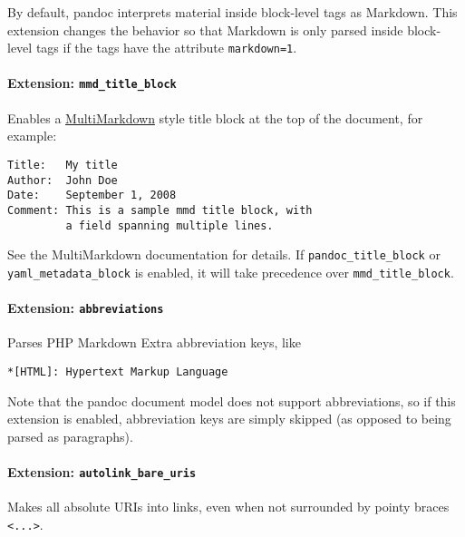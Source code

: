 \documentclass[]{article}
\let\oldparagraph\paragraph
\renewcommand{\paragraph}[1]{\oldparagraph{#1}\mbox{}}
\begin{document}
By default, pandoc interprets material inside block-level tags as
Markdown. This extension changes the behavior so that Markdown is only
parsed inside block-level tags if the tags have the attribute
\texttt{markdown=1}.

\paragraph{\texorpdfstring{Extension:
\texttt{mmd\_title\_block}}{Extension: mmd\_title\_block}}\label{extension-mmd_title_block}

Enables a \href{http://fletcherpenney.net/multimarkdown/}{MultiMarkdown}
style title block at the top of the document, for example:

\begin{verbatim}
Title:   My title
Author:  John Doe
Date:    September 1, 2008
Comment: This is a sample mmd title block, with
         a field spanning multiple lines.
\end{verbatim}

See the MultiMarkdown documentation for details. If
\texttt{pandoc\_title\_block} or \texttt{yaml\_metadata\_block} is
enabled, it will take precedence over \texttt{mmd\_title\_block}.

\paragraph{\texorpdfstring{Extension:
\texttt{abbreviations}}{Extension: abbreviations}}\label{extension-abbreviations}

Parses PHP Markdown Extra abbreviation keys, like

\begin{verbatim}
*[HTML]: Hypertext Markup Language
\end{verbatim}

Note that the pandoc document model does not support abbreviations, so
if this extension is enabled, abbreviation keys are simply skipped (as
opposed to being parsed as paragraphs).

\paragraph{\texorpdfstring{Extension:
\texttt{autolink\_bare\_uris}}{Extension: autolink\_bare\_uris}}\label{extension-autolink_bare_uris}

Makes all absolute URIs into links, even when not surrounded by pointy
braces \texttt{\textless{}...\textgreater{}}.
\end{document}
